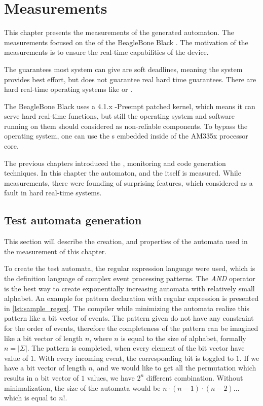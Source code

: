 
\chapter{Measurements}
\label{ch:measurements}

This chapter presents the measurements of the generated automaton. The measurements focused on the \pru{} of the BeagleBone Black \sbc{}. The motivation of the measurements is to ensure the real-time capabilities of the device.

The guarantees most system can give are soft deadlines, meaning the system provides best effort, but does not guarantee real hard time guarantees. There are hard real-time operating systems like  or .

The BeagleBone Black uses a 4.1.x -Preempt patched kernel, which means it can serve hard real-time functions, but still the operating system and software running on them should considered as non-reliable components. To bypass the operating system, one can use the \pru{}s embedded inside of the AM335x processor core.

The previous chapters introduced the \pru{}, monitoring and code generation techniques. In this chapter the automaton, and the \pru{} itself is measured. While measurements, there were founding of surprising features, which considered as a fault in hard real-time systems.

\section{Test automata generation}

This section will describe the creation, and properties of the automata used in the measurement of this chapter.

To create the test automata, the regular expression language were used, which is the definition language of complex event processing patterns. The \emph{AND} operator is the best way to create exponentially increasing automata with relatively small alphabet. An example for pattern declaration with regular expression is presented in \cref{lst:sample_regex}.
The compiler while minimizing the automata realize this pattern like a bit vector of events. The pattern given do not have any constraint for the order of events, therefore the completeness of the pattern can be imagined like a bit vector of length $n$, where $n$ is equal to the size of alphabet, formally $n=|\Sigma|$. The pattern is completed, when every element of the bit vector have value of $1$.
With every incoming event, the corresponding bit is toggled to $1$. If we have a bit vector of length $n$, and we would like to get all the permutation which results in a bit vector of $1$ values, we have $2^n$ different combination. Without minimalization, the size of the automata would be $n \cdot (n-1) \cdot (n-2) \ldots $ which is equal to $n!$.

